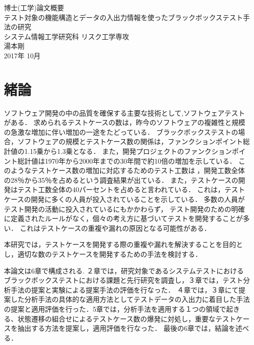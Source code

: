 \documentclass[10pt,a4j]{jarticle}
\begin{document}
\thispagestyle{empty}
\vspace*{2cm}
\begin{center}
\LARGE
博士(工学)論文概要\\[2cm]
テスト対象の機能構造とデータの入出力情報を使ったブラックボックステスト手法の研究\\[8cm]
システム情報工学研究科 リスク工学専攻\\[1cm]
湯本剛 \\[2cm]
2017年 10月
\end{center}


\pagebreak \setcounter{page}{1}

\section{緒論} \label{chap:1}
ソフトウェア開発の中の品質を確保する主要な技術として,ソフトウェアテストがある．
求められるテストケースの数は，昨今のソフトウェアの複雑性と規模の急激な増加に伴い増加の一途をたどっている．
ブラックボックステストの場合，ソフトウェアの規模とテストケース数の関係は，ファンクションポイント総計値の1.15乗から1.3乗となる\cite{jones1998estimating}．
また，開発プロジェクトのファンクションポイント総計値は1970年から2000年までの30年間で約10倍の増加を示している\cite{longstreet2000}．
このようなテストケース数の増加に対応するためのテスト工数は，開発工数全体の28％から35％を占めるという調査結果が出ている\cite{IPA2015}．
また，テストケースの開発はテスト工数全体の40パーセントを占めると言われている\cite{van2013tpi}．
これは，テストケースの開発に多くの人員が投入されていることを示している．
多数の人員がテスト開発の活動に投入されているにもかかわらず， テスト開発のための明確に定義されたルールがなく，個々の考え方に基づいてテストを開発することが多い．
これはテストケースの重複や漏れの原因となる可能性がある．

本研究では，テストケースを開発する際の重複や漏れを解決することを目的とし，適切な数のテストケースを開発するための手法を検討する．

本論文は6章で構成される. 
２章では，研究対象であるシステムテストにおけるブラックボックステストにおける課題と先行研究を調査し，３章では，テスト分析手法の提案と実験による提案手法の評価を行なった．
４章では，３章にて提案した分析手法の具体的な適用方法としてテストデータの入出力に着目した手法の提案と適用評価を行った．5章では，分析手法を適用する１つの領域で起きる、状態遷移の組合せによるテストケース数の爆発に対処し，重要なテストケースを抽出する方法を提案し，適用評価を行なった．
最後の6章では，結論を述べる．
\end{document}
